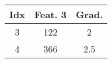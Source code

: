 \documentclass{standalone}
\begin{document}
	\begin{tabular}{cc|c}
		\toprule
		Idx & Feat. 3 & Grad. \\
		\midrule
		\rowcolor{CBThree}
		3 & 122 & 2 \\
		\rowcolor{CBFour}
		4 & 366 & 2.5\\
		\bottomrule
	\end{tabular}
\end{document}
